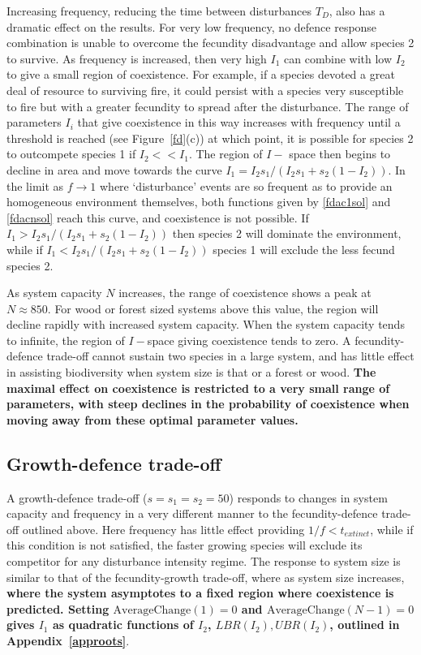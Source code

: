 \documentclass[preprint,10pt,reqno]{amsart}
\begin{document}
Increasing frequency, reducing the time between disturbances $T_D$, also has a dramatic effect on the results. For very low frequency, no defence response combination is unable to overcome the fecundity disadvantage and allow species 2 to survive. As frequency is increased, then very high $I_1$ can combine with low $I_2$ to give a small region of coexistence. For example, if a species devoted a great deal of resource to surviving fire, it could persist with a species very susceptible to fire but with a greater fecundity to spread after the disturbance. The range of parameters $I_i$ that give coexistence in this way increases with frequency until a threshold is reached (see Figure~\ref{fd}(c)) at which point, it is possible for species 2 to outcompete species 1 if $I_2<<I_1$. The region of $I-$ space then begins to decline in area and move towards the curve $I_1=I_2s_1/(I_2s_1+s_2(1-I_2))$. In the limit as $f \to 1$ where `disturbance' events are so frequent as to provide an homogeneous environment themselves, both functions given by \eqref{fdac1sol} and \eqref{fdacnsol} reach this curve, and coexistence is not possible. If $I_1>I_2s_1/(I_2s_1+s_2(1-I_2))$ then species 2 will dominate the environment, while if $I_1<I_2s_1/(I_2s_1+s_2(1-I_2))$ species 1 will exclude the less fecund species 2.

As system capacity $N$ increases, the range of coexistence shows a peak at $N \approx 850$. For wood or forest sized systems above this value, the region will decline rapidly with increased system capacity. When the system capacity tends to infinite, the region of $I-$space giving coexistence tends to zero. A fecundity-defence trade-off cannot sustain two species in a large system, and has little effect in assisting biodiversity when system size is that or a forest or wood. \textbf{The maximal effect on coexistence is restricted to a very small range of parameters, with steep declines in the probability of coexistence when moving away from these optimal parameter values.} 

\subsection{Growth-defence trade-off}
A growth-defence trade-off ($s=s_1=s_2=50$) responds to changes in system capacity and frequency in a very different manner to the fecundity-defence trade-off outlined above. Here frequency has little effect providing $1/f<t_{extinct}$, while if this condition is not satisfied, the faster growing species will exclude its competitor for any disturbance intensity regime. The response to system size is similar to that of the fecundity-growth trade-off, where as system size increases, \textbf{where the system asymptotes to a fixed region where coexistence is predicted. Setting $\text{AverageChange}(1)=0$ and $\text{AverageChange}(N-1)=0$ gives $I_1$ as quadratic functions of $I_2$, $LBR(I_2), UBR(I_2)$, outlined in Appendix~\ref{approots}}.
\end{document}
